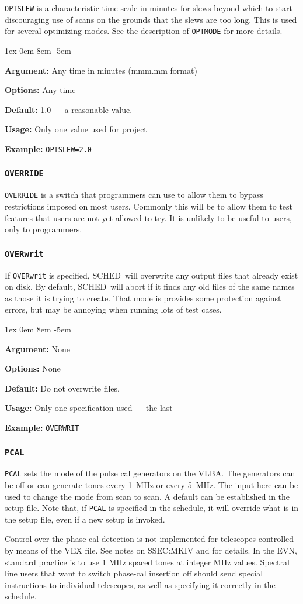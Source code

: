 \documentclass{report}
\newcommand{\schedb}{{\sc SCHED~}}
\newcommand{\rcwbox}[5]{
  \begin{list}{}{\parsep 1ex  \itemsep 0em
                 \leftmargin 8em  \itemindent -5em }
    \item {\bf Argument:} #1
    \item {\bf Options:}  #2
    \item {\bf Default:}  #3
    \item {\bf Usage:}    #4
    \item {\bf Example:}  #5
  \end{list}
}
\begin{document}
{\tt OPTSLEW} is a characteristic time scale in minutes for slews
beyond which to start discouraging use of scans on the grounds that
the slews are too long.  This is used for several optimizing modes.
See the description of {\tt OPTMODE} for more details.

\rcwbox
{Any time in minutes (mmm.mm format)}
{Any time}
{1.0 --- a reasonable value.}
{Only one value used for project}
{{\tt OPTSLEW=2.0}}


\subsubsection{\label{MP:OVERRIDE}{\tt OVERRIDE}}

{\tt OVERRIDE} is a switch that programmers can use to allow them to
bypass restrictions imposed on most users.  Commonly this will be to
allow them to test features that users are not yet allowed to try. It is
unlikely to be useful to users, only to programmers.


\subsubsection{\label{MP:OVERWRIT}{\tt OVERwrit}}

If {\tt OVERwrit} is specified, \schedb will overwrite any output
files that already exist on disk.  By default, \schedb will abort
if it finds any old files of the same names as those it is trying to
create.  That mode is provides some protection against errors, but
may be annoying when running lots of test cases.

\rcwbox
{None}
{None}
{Do not overwrite files.}
{Only one specification used --- the last}
{{\tt OVERWRIT}}


\subsubsection{\label{MP:PCAL}{\tt PCAL}}

{\tt PCAL} sets the mode of the pulse cal generators on the VLBA. The
generators can be off or can generate tones every 1~MHz or every
5~MHz. The input here can be used to change the mode from scan to
scan. A default can be established in the setup file.  Note that, if
{\tt PCAL} is specified in the schedule, it will override what is
in the setup file, even if a new setup is invoked.

Control over the phase cal detection is not implemented for telescopes
controlled by means of the VEX file. See notes on 
{SSEC:MKIV} and  for details. In the EVN,
standard practice is to use 1 MHz spaced tones at integer MHz
values. Spectral line users that want to switch phase-cal insertion
off should send special instructions to individual telescopes, as well
as specifying it correctly in the schedule.
\end{document}
